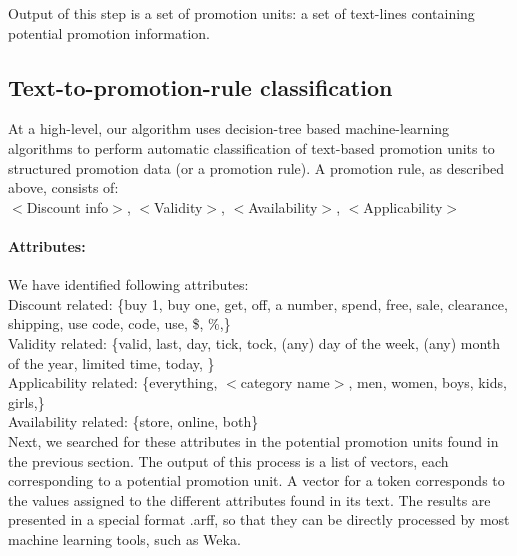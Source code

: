 \documentclass[11pt]{article}
\begin{document}
Output of this step is a set of promotion units: a set of text-lines containing potential promotion information.

\subsection{Text-to-promotion-rule classification}



At a high-level, our algorithm uses decision-tree based machine-learning algorithms to perform automatic classification of text-based promotion units to structured promotion data (or a promotion rule). A promotion rule, as described above, consists of:\\
$<$Discount info$>$, $<$Validity$>$, $<$Availability$>$, $<$Applicability$>$

\paragraph{Attributes:} We have identified following attributes:\\
Discount related: \{buy 1, buy one, get, off, a number, spend, free, sale, clearance, shipping, use code, code, use, \$, \%,\}\\
Validity related: \{valid, last, day, tick, tock, (any) day of the week, (any) month of the year, limited time, today, \}\\
Applicability related: \{everything,  $<$category name$>$, men, women, boys, kids, girls,\}\\
Availability related: \{store, online, both\}\\

Next, we searched for these attributes in the potential promotion units found in the previous section. The output of this process is a list of vectors, each corresponding to a potential promotion unit. A vector for a token corresponds to the values assigned to the different attributes found in its text. The results are presented in a special format .arff, so that they can be directly processed by most machine learning tools, such as Weka. 



\end{document}
